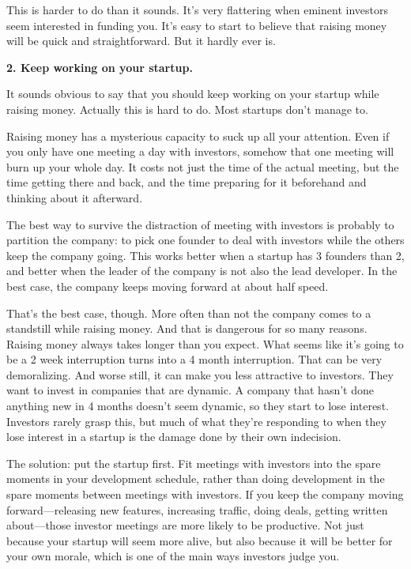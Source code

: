 This is harder to do than it sounds. It's very flattering when eminent
investors seem interested in funding you. It's easy to start to believe
that raising money will be quick and straightforward. But it hardly ever
is.

\textbf{2. Keep working on your startup.}

It sounds obvious to say that you should keep working on your startup
while raising money. Actually this is hard to do. Most startups don't
manage to.

Raising money has a mysterious capacity to suck up all your attention.
Even if you only have one meeting a day with investors, somehow that one
meeting will burn up your whole day. It costs not just the time of the
actual meeting, but the time getting there and back, and the time
preparing for it beforehand and thinking about it afterward.

The best way to survive the distraction of meeting with investors is
probably to partition the company: to pick one founder to deal with
investors while the others keep the company going. This works better
when a startup has 3 founders than 2, and better when the leader of the
company is not also the lead developer. In the best case, the company
keeps moving forward at about half speed.

That's the best case, though. More often than not the company comes to a
standstill while raising money. And that is dangerous for so many
reasons. Raising money always takes longer than you expect. What seems
like it's going to be a 2 week interruption turns into a 4 month
interruption. That can be very demoralizing. And worse still, it can
make you less attractive to investors. They want to invest in companies
that are dynamic. A company that hasn't done anything new in 4 months
doesn't seem dynamic, so they start to lose interest. Investors rarely
grasp this, but much of what they're responding to when they lose
interest in a startup is the damage done by their own indecision.

The solution: put the startup first. Fit meetings with investors into
the spare moments in your development schedule, rather than doing
development in the spare moments between meetings with investors. If you
keep the company moving forward---releasing new features, increasing
traffic, doing deals, getting written about---those investor meetings
are more likely to be productive. Not just because your startup will
seem more alive, but also because it will be better for your own morale,
which is one of the main ways investors judge you.

